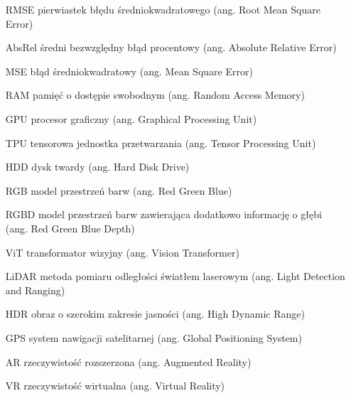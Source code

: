 \flushleft



\begin{itemize}[noitemsep,topsep=0pt,parsep=0pt,partopsep=0pt,labelwidth=3cm,align=left,itemindent=3cm]
\item[RMSE] pierwiastek błędu średniokwadratowego (ang. Root Mean Square Error)
    \item[AbsRel] średni bezwzględny błąd procentowy (ang. Absolute Relative Error)
    \item[MSE] błąd średniokwadratowy (ang. Mean Square Error)
    \item[RAM] pamięć o dostępie swobodnym (ang. Random Access Memory)
    \item[GPU] procesor graficzny (ang. Graphical Processing Unit)
    \item[TPU] tensorowa jednostka przetwarzania (ang. Tensor Processing Unit)
    \item[HDD] dysk twardy (ang. Hard Disk Drive)
    \item[RGB] model przestrzeń barw (ang. Red Green Blue)
    \item[RGBD] model przestrzeń barw zawierająca dodatkowo informację o głębi (ang. Red Green Blue Depth)
    \item[ViT] transformator wizyjny (ang. Vision Transformer)
    \item[LiDAR] metoda pomiaru odległości światłem laserowym (ang. Light Detection and Ranging)
    \item[HDR] obraz o szerokim zakresie jasności (ang. High Dynamic Range)
    \item[GPS] system nawigacji satelitarnej (ang. Global Positioning System)
    \item[AR] rzeczywistość rozszerzona (ang. Augmented Reality)
    \item[VR] rzeczywistość wirtualna (ang. Virtual Reality)
\end{itemize}

